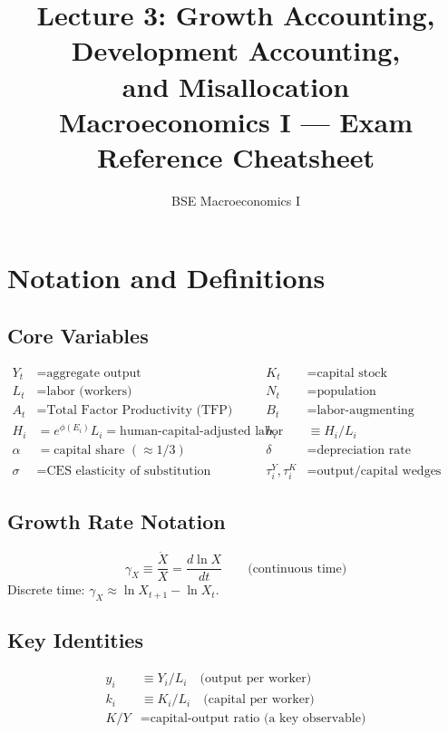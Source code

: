 \documentclass[a4paper,11pt]{article}
\title{\textbf{Lecture 3: Growth Accounting, Development Accounting,\\and Misallocation}\\[0.3em]
\large Macroeconomics I --- Exam Reference Cheatsheet}
\author{BSE Macroeconomics I}
\date{}
\begin{document}
\maketitle
\tableofcontents
\clearpage

\section{Notation and Definitions}

\subsection*{Core Variables}
\begin{align*}
Y_t &= \text{aggregate output} & K_t &= \text{capital stock} \\
L_t &= \text{labor (workers)} & N_t &= \text{population} \\
A_t &= \text{Total Factor Productivity (TFP)} & B_t &= \text{labor-augmenting technology} \\
H_i &= e^{\phi(E_i)} L_i = \text{human-capital-adjusted labor} & h_i &\equiv H_i/L_i \\
\alpha &= \text{capital share } (\approx 1/3) & \delta &= \text{depreciation rate} \\
\sigma &= \text{CES elasticity of substitution} & \tau_i^Y, \tau_i^K &= \text{output/capital wedges}
\end{align*}

\subsection*{Growth Rate Notation}
\[
\gamma_X \equiv \frac{\dot{X}}{X} = \frac{d \ln X}{dt} \qquad \text{(continuous time)}
\]
Discrete time: $\gamma_X \approx \ln X_{t+1} - \ln X_t$.

\subsection*{Key Identities}
\begin{align*}
y_i &\equiv Y_i / L_i \quad \text{(output per worker)} \\
k_i &\equiv K_i / L_i \quad \text{(capital per worker)} \\
K/Y &= \text{capital-output ratio (a key observable)}
\end{align*}
\end{document}
